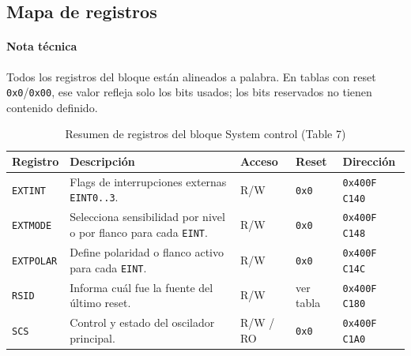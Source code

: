 \subsection{Mapa de registros}
\paragraph{Nota t\'ecnica}
Todos los registros del bloque est\'an alineados a palabra. En tablas con reset \texttt{0x0}/\texttt{0x00}, ese valor refleja solo los bits usados; los bits reservados no tienen contenido definido.

\begin{table}[H]
  \centering
  \small
  \renewcommand{\arraystretch}{1.15}
  \caption{Resumen de registros del bloque System control (Table 7)}
  \begin{tabularx}{0.96\textwidth}{|>{\raggedright\arraybackslash}p{}|>{\raggedright\arraybackslash}X|>{\centering\arraybackslash}p{}|>{\centering\arraybackslash}p{}|>{\centering\arraybackslash}p{}|}
    \hline
    \textbf{Registro} & \textbf{Descripci\'on} & \textbf{Acceso} & \textbf{Reset} & \textbf{Direcci\'on} \\
    \hline
    \texttt{EXTINT} & Flags de interrupciones externas \texttt{EINT0..3}. & R/W & \texttt{0x0} & \texttt{0x400F C140} \\
    \hline
    \texttt{EXTMODE} & Selecciona sensibilidad por nivel o por flanco para cada \texttt{EINT}. & R/W & \texttt{0x0} & \texttt{0x400F C148} \\
    \hline
    \texttt{EXTPOLAR} & Define polaridad o flanco activo para cada \texttt{EINT}. & R/W & \texttt{0x0} & \texttt{0x400F C14C} \\
    \hline
    \texttt{RSID} & Informa cu\'al fue la fuente del \'ultimo reset. & R/W & ver tabla & \texttt{0x400F C180} \\
    \hline
    \texttt{SCS} & Control y estado del oscilador principal. & R/W / RO & \texttt{0x0} & \texttt{0x400F C1A0} \\
    \hline
  \end{tabularx}
\end{table}

